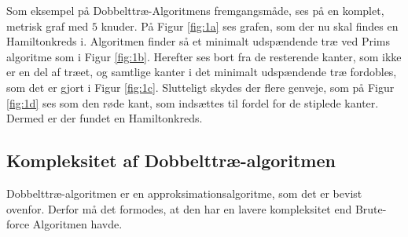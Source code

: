 \begin{figure}[htbp]
\centering
	\begin{minipage}[t]{0.5\textwidth}
		\centering
			\scalebox{0.7}{}
		\label{dtex1}
		\label{fig:1a}
	\end{minipage}%
	\begin{minipage}[t]{0.5\textwidth}
		\centering
			\scalebox{0.7}{}
		\label{dtex2}
		\label{fig:1b}
	\end{minipage}

	\vspace{10mm}

	\begin{minipage}[t]{0.5\textwidth}
		\centering		
			\scalebox{0.7}{}
		\label{dtex3}
		\label{fig:1c}
	\end{minipage}%
	\begin{minipage}[t]{0.5\textwidth}
		\centering
			\scalebox{0.7}{}
		\label{dtex4}
		\label{fig:1d}
	\end{minipage}

	\vspace{5mm}

	\caption{} \label{fig:1}
\end{figure}

\begin{exmp}
	Som eksempel på Dobbelttræ-Algoritmens fremgangsmåde, ses på en komplet, metrisk graf med $5$ knuder.
På Figur \ref{fig:1a} ses grafen, som der nu skal findes en Hamiltonkreds i.
	Algoritmen finder så et minimalt udspændende træ ved Prims algoritme som i Figur \ref{fig:1b}.
	Herefter ses bort fra de resterende kanter, som ikke er en del af træet, og samtlige kanter i det minimalt udspændende træ fordobles, som det er gjort i Figur \ref{fig:1c}.
	Slutteligt skydes der flere genveje, som på Figur \ref{fig:1d} ses som den røde kant, som indsættes til fordel for de stiplede kanter. Dermed er der fundet en Hamiltonkreds.
\end{exmp}

\subsection{Kompleksitet af Dobbelttræ-algoritmen}
Dobbelttræ-algoritmen er en approksimationsalgoritme, som det er bevist ovenfor. Derfor må det formodes, at den har en lavere kompleksitet end Brute-force Algoritmen havde.


